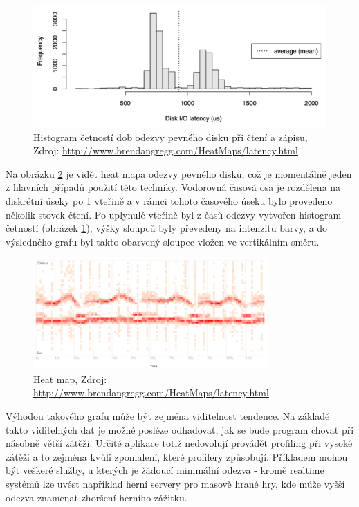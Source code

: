 \documentclass[czech,BP]{thesiskiv}
\begin{document}
\begin{figure}[h]
    \centering
    \includegraphics[interpolate,width=1.0\textwidth]{img/prof_histogram.png}
    \caption{Histogram četností dob odezvy pevného disku při čtení a zápisu, Zdroj: \url{http://www.brendangregg.com/HeatMaps/latency.html}}
    \label{obr:heathistoview}
\end{figure}

Na obrázku \ref{obr:heatview} je vidět heat mapa odezvy pevného disku, což je momentálně jeden z hlavních případů použití této techniky. Vodorovná časová osa je rozdělena na diskrétní úseky po 1 vteřině a v rámci tohoto časového úseku bylo provedeno několik stovek čtení. Po uplynulé vteřině byl z časů odezvy vytvořen histogram četností (obrázek \ref{obr:heathistoview}), výšky sloupců byly převedeny na intenzitu barvy, a do výsledného grafu byl takto obarvený sloupec vložen ve vertikálním směru.

\begin{figure}[h]
    \centering
    \includegraphics[interpolate,width=0.8\textwidth]{img/prof_heatmap.png}
    \caption{Heat map, Zdroj: \url{http://www.brendangregg.com/HeatMaps/latency.html}}
    \label{obr:heatview}
\end{figure}

Výhodou takového grafu může být zejména viditelnost tendence. Na základě takto viditelných dat je možné posléze odhadovat, jak se bude program chovat při násobně větší zátěži. Určité aplikace totiž nedovolují provádět profiling při vysoké zátěži a to zejména kvůli zpomalení, které profilery způsobují. Příkladem mohou být veškeré služby, u kterých je žádoucí minimální odezva - kromě realtime systémů lze uvést například herní servery pro masově hrané hry, kde může vyšší odezva znamenat zhoršení herního zážitku.
\end{document}
